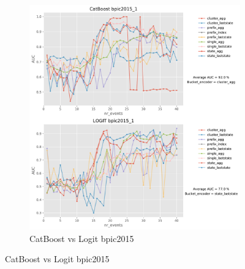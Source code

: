 \documentclass[twoside,11pt]{Latex/Classes/PhDthesisPSnPDF}
\begin{document}
\begin{figure}[t!]
\begin{subfigure}{0.48\textwidth}
		\includegraphics[width=\linewidth]{images/catboost/graphslogit/bpic2015_1_CatBoost_logit.pdf}
		\caption{CatBoost vs Logit bpic2015} \label{fig:b151cl}
	\end{subfigure}
	

\end{figure}
\end{document}
